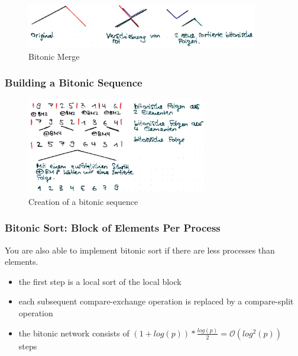 \begin{figure}[H]
\centering
\includegraphics[width=0.9\textwidth]{figures/bitonic-merge.png}
\caption{Bitonic Merge}
\end{figure}

\clearpage
\hypertarget{building-a-bitonic-sequence}{%
\subsubsection{Building a Bitonic
Sequence}\label{building-a-bitonic-sequence}}

\begin{figure}[H]
\centering
\includegraphics[width=0.7\textwidth]{figures/create-bitonic-sequence.png}
\caption{Creation of a bitonic sequence}
\end{figure}

\hypertarget{bitonic-sort-block-of-elements-per-process}{%
\subsubsection{Bitonic Sort: Block of Elements Per
Process}\label{bitonic-sort-block-of-elements-per-process}}

You are also able to implement bitonic sort if there are less processes
than elements.

\begin{itemize}
\tightlist
\item
  the first step is a local sort of the local block
\item
  each subsequent compare-exchange operation is replaced by a
  compare-split operation
\item
  the bitonic network consists of $(1 + log (p))*\frac{log (p)}{2} = \mathcal{O}(log^2 (p))$
  steps
\end{itemize}

